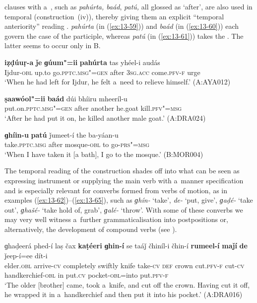  clauses with a~, such as \textit{pahúrta, baád}, \textit{patú,} all glossed as `after', are also used in temporal  (construction~(iv)), thereby giving them an explicit ``temporal anteriority'' reading \citep[159]{cristofaro2005}. \textit{pahúrta} (in (\ref{ex:13-59})) and \textit{baád} (in (\ref{ex:13-60})) each govern the  case of the participle, whereas \textit{patú} (in (\ref{ex:13-61})) takes the . The latter seems to occur only in B. 

\begin{exe}
\ex
\label{ex:13-59}
\gll \textbf{iẓḍúuṛ-a} \textbf{ǰe} \textbf{ɡúum"=ii} \textbf{pahúrta} tas yhéel-i audás \\
Ijdur-\textsc{obl} up.to go.\textsc{pptc.msg"=gen} after \textsc{3sg.acc} come.\textsc{pfv-f} urge \\
\glt `When he had left for Ijdur, he felt a~need to relieve himself.' (A:AYA012)

\ex
\label{ex:13-60}
\gll \textbf{ṣaawóol"=ii} \textbf{baád} dúi bhíiru mheeríl-u \\
put.on.\textsc{pptc.msg"=gen} after another he.goat kill.\textsc{pfv"=msg}  \\
\glt `After he had put it on, he killed another male goat.' (A:DRA024)

\ex
\label{ex:13-61}
\gll \textbf{ɡhíin-u} \textbf{patú} ǰumeet-í the ba-yáan-u  \\
take.\textsc{pptc.msg} after mosque-\textsc{obl} to go-\textsc{prs"=msg} \\
\glt `When I have taken it [a bath], I go to the mosque.' (B:MOR004) 
\end{exe}

 The temporal  reading of the  construction shades off into what can be seen as expressing instrument or supplying the main verb with a~manner specification and is especially relevant for converbs formed from  verbs of motion, as in examples (\ref{ex:13-62})--(\ref{ex:13-65}), such as \textit{ɡhín-} `take', \textit{de-} `put, give', \textit{ɡaḍé-} `take out', \textit{ɡhašé-} `take hold of, grab', \textit{ɡalé-} `throw'. With some of these converbs we may very well witness a~further grammaticalisation into postpositions or, alternatively, the development of compound verbs (see ). 

\ea
\label{ex:13-62}
\gll ɡhaḍeerá phed-í laṣ čax \textbf{kaṭéeri} \textbf{ɡhin-í} se taáǰ čhiníl-i čhin-í \textbf{rumeel-í} \textbf{maǰí} \textbf{de} ǰeep-í=ee dít-i \\
elder.\textsc{obl} arrive-\textsc{cv} completely swiftly knife take-\textsc{cv} \textsc{def} crown cut.\textsc{pfv-f} cut-\textsc{cv} handkerchief-\textsc{obl} in put.\textsc{cv} pocket-\textsc{obl}=into put.\textsc{pfv-f} \\
\glt `The older [brother] came, took a~knife, and cut off the crown. Having cut it off, he wrapped it in a~handkerchief and then put it into his pocket.' (A:DRA016)

